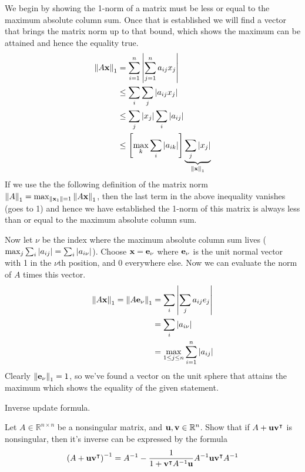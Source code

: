 \documentclass[boxes,pages]{homework}
\newcommand{\tpose}[1]{#1^\intercal}
\newcommand{\inv}[1]{#1^{-1}}
\begin{document}
\begin{solution}
	We begin by showing the 1-norm of a matrix must be less or equal to the maximum absolute column sum. Once that is established we will find a vector that brings the matrix norm up to that bound, which shows the maximum can be attained and hence the equality true.
	\begin{align*}
		\norm{A\vb{x}}_1 & = \sum_{i = 1}^n\abs{\sum_{j = 1}^n a_{ij}x_j}                                    \\
		                 & \leq \sum_i\sum_j\abs{a_{ij}x_j}                                                  \\
		                 & \leq \sum_j\abs{x_j}\sum_i\abs{a_{ij}}                                            \\
		                 & \leq \qty[\max_k\sum_i\abs{a_{ik}}]\underbrace{\sum_j\abs{x_j}}_{\norm{\vb{x}}_1}
	\end{align*}
	If we use the the following definition of the matrix norm $\norm{A}_1 = \max_{\norm{\vb{x}_1} = 1}\norm{A\vb{x}}_1$, then the last term in the above inequality vanishes (goes to 1) and hence we have established the 1-norm of this matrix is always less than or equal to the maximum absolute column sum.

	Now let $\nu$ be the index where the maximum absolute column sum lives ($\max_j\sum_i\abs{a_{ij}} = \sum_i\abs{a_{i\nu}}$). Choose $\vb{x} = \vb{e}_\nu$ where $\vb{e}_\nu$ is the unit normal vector with 1 in the $\nu$th position, and 0 everywhere else. Now we can evaluate the norm of $A$ times this vector.
	\begin{align*}
		\norm{A\vb{x}}_1 = \norm{A\vb{e}_\nu}_1 & = \sum_i\abs{\sum_j a_{ij}e_j}                    \\
		                                        & = \sum_i\abs{a_{i\nu}}                            \\
		                                        & = \max_{1\leq j \leq n}\sum_{i = 1}^n\abs{a_{ij}}
	\end{align*}
	Clearly $\norm{\vb{e}_\nu}_1 = 1$, so we've found a vector on the unit sphere that attains the maximum which shows the equality of the given statement.
\end{solution}

\begin{problem}
Inverse update formula.

Let $A\in\mathbb{R}^{n\times n}$ be a nonsingular matrix, and $\vb{u}, \vb{v}\in\mathbb{R}^n$. Show that if $A + \vb{u}\tpose{\vb{v}}$ is nonsingular, then it's inverse can be expressed by the formula
\begin{equation*}
	\inv{\qty(A + \vb{u}\tpose{\vb{v}})} = \inv{A} - \frac{1}{1 + \tpose{\vb{v}}\inv{A}\vb{u}}\inv{A}\vb{u}\tpose{\vb{v}}\inv{A}
\end{equation*}
\end{problem}
\end{document}
